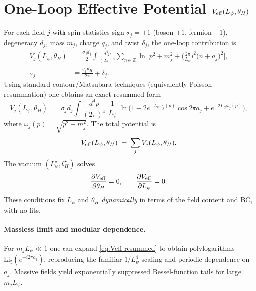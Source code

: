 \documentclass[12pt]{article}
\begin{document}
\section{One-Loop Effective Potential $V_{\rm eff}(L_\psi,\theta_H)$}
For each field $j$ with spin-statistics sign $\sigma_j=\pm 1$ (boson $+1$, fermion $-1$), degeneracy $d_j$, mass $m_j$,
charge $q_j$, and twist $\delta_j$, the one-loop contribution is
\begin{align}
V_j(L_\psi,\theta_H)
&=\frac{\sigma_j d_j}{2}\int \!\frac{d^4p}{(2\pi)^4}\sum_{n\in\mathbb{Z}}
\ln\!\Big[p^2 + m_j^2 + \big(\tfrac{2\pi}{L_\psi}\big)^2\big(n+a_j\big)^2\Big],
\\
a_j &\equiv \frac{q_j\,\theta_H}{2\pi} + \delta_j.
\end{align}
Using standard contour/Matsubara techniques (equivalently Poisson resummation) one obtains an exact resummed form
\begin{equation}
V_j(L_\psi,\theta_H) \;=\; \sigma_j d_j \int \!\frac{d^4p}{(2\pi)^4}\; \frac{1}{L_\psi}\;
\ln\!\Big(1 - 2 e^{-L_\psi \omega_j(p)} \cos 2\pi a_j + e^{-2 L_\psi \omega_j(p)}\Big),
\label{eq:Veff-resummed}
\end{equation}
where $\omega_j(p)=\sqrt{p^2+m_j^2}$. The total potential is
\begin{equation}
V_{\rm eff}(L_\psi,\theta_H) \;=\; \sum_j V_j(L_\psi,\theta_H).
\end{equation}
The vacuum $(L_\psi^\star,\theta_H^\star)$ solves
\begin{equation}
\frac{\partial V_{\rm eff}}{\partial \theta_H}=0,
\qquad
\frac{\partial V_{\rm eff}}{\partial L_\psi}=0.
\label{eq:stationary}
\end{equation}
These conditions fix $L_\psi$ and $\theta_H$ \emph{dynamically} in terms of the field content and BC, with no fits.

\paragraph{Massless limit and modular dependence.}
For $m_j L_\psi \ll 1$ one can expand \eqref{eq:Veff-resummed} to obtain polylogarithms $\mathrm{Li}_5(e^{\pm i 2\pi a_j})$,
reproducing the familiar $1/L_\psi^4$ scaling and periodic dependence on $a_j$. Massive fields yield exponentially
suppressed Bessel-function tails for large $m_j L_\psi$.
\end{document}
